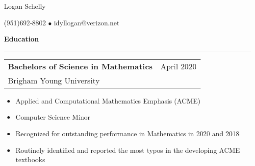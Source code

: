 \documentclass{article}
\newcommand{\jobInfo}[4]{
  \begingroup
  \setlength{\tabcolsep}{0ex}
  \begin{tabularx}{\linewidth}{X r}
    #1 & %
    #2\\ %
    #3 & %
    #4   %
  \end{tabularx}%
  \endgroup%
}
\newcommand{\degree}[4]{
  \jobInfo{\textbf{#1}}{#2}{#3}{#4}
}
\begin{document}
\begin{center}
{\Large Logan Schelly} %

(951)\phantom{-}692-8802 %
$\bullet$ %
idyllogan@verizon.net %
\end{center}
\begin{comment}
\textbf{Objective}
\smallskip
\hrule
I am a recent graduate.
My ultimate career goal would be to work on a project like Intel's Math Kernel Library.
For the time being I am looking for an entry-level job in software, data, or (if possible) high performance computing.
\end{comment}
\textbf{Education}
\smallskip
\hrule

\degree{Bachelors of Science in Mathematics}{April 2020}{Brigham Young University}{}%
%
\begin{itemize}[labelindent=2ex, itemsep=0ex, parsep=0ex, partopsep=0ex, topsep= -.7ex]%
  \item Applied and Computational Mathematics Emphasis (ACME)
  \item Computer Science Minor
  \item Recognized for outstanding performance in Mathematics in 2020 and 2018
  \item Routinely identified and reported the most typos in the developing ACME textbooks
\end{itemize}
\end{document}
